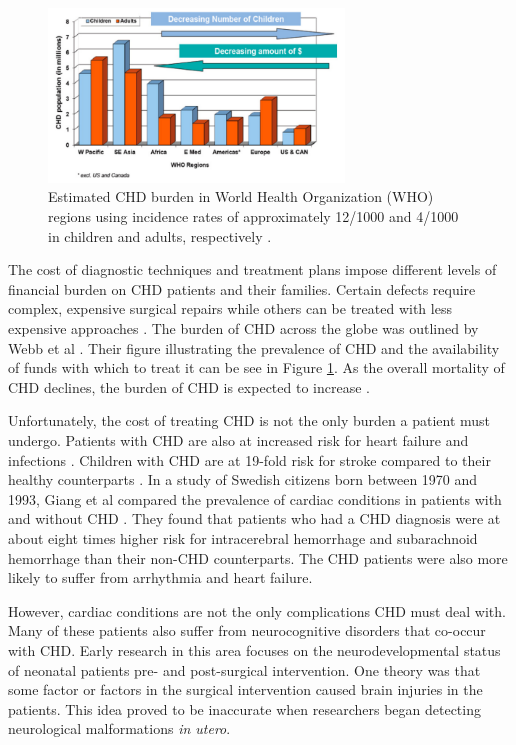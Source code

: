 \begin{figure}
\centering
\includegraphics[width=0.7\textwidth]{5/CHD-burden-webb.png}
\caption{Estimated CHD burden in World Health Organization (WHO) regions using incidence rates of approximately 12/1000 and 4/1000 in children and adults, respectively \cite{Webb2015}.}
\label{ch5:fig:CHD-burden}
\end{figure}

The cost of diagnostic techniques and treatment plans impose different levels of financial burden on CHD patients and their families. Certain defects require complex, expensive surgical repairs while others can be treated with less expensive approaches \cite{Mozaffarian2016}. The burden of CHD across the globe was outlined by Webb et al \cite{Webb2015}. Their figure illustrating the prevalence of CHD and the availability of funds with which to treat it can be see in Figure \ref{ch5:fig:CHD-burden}. As the overall mortality of CHD declines, the burden of CHD is expected to increase \cite{Mozaffarian2016}.

Unfortunately, the cost of treating CHD is not the only burden a patient must undergo. Patients with CHD are also at increased risk for heart failure and infections \cite{Mozaffarian2016}. Children with CHD are at 19-fold risk for stroke compared to their healthy counterparts \cite{Fox2015}. In a study of Swedish citizens born between 1970 and 1993, Giang et al compared the prevalence of cardiac conditions in patients with and without CHD \cite{Giang2018}. They found that patients who had a CHD diagnosis were at about eight times higher risk for intracerebral hemorrhage and subarachnoid hemorrhage than their non-CHD counterparts. The CHD patients were also more likely to suffer from arrhythmia and heart failure. 


However, cardiac conditions are not the only complications CHD must deal with. Many of these patients also suffer from neurocognitive disorders that co-occur with CHD. Early research in this area focuses on the neurodevelopmental status of neonatal patients pre- and post-surgical intervention. One theory was that some factor or factors in the surgical intervention caused brain injuries in the patients. This idea proved to be inaccurate when researchers began detecting neurological malformations \textit{in utero}.

